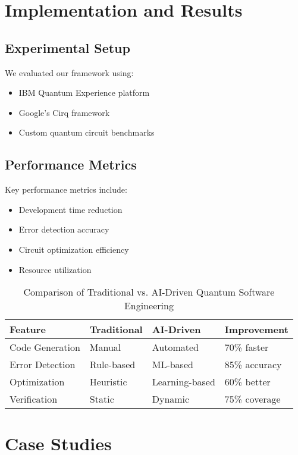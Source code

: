 \documentclass[10pt,twocolumn]{article}
\begin{document}
\section{Implementation and Results}
\subsection{Experimental Setup}
We evaluated our framework using:
\begin{itemize}[leftmargin=*]
    \item IBM Quantum Experience platform
    \item Google's Cirq framework
    \item Custom quantum circuit benchmarks
\end{itemize}

\subsection{Performance Metrics}
Key performance metrics include:
\begin{itemize}[leftmargin=*]
    \item Development time reduction
    \item Error detection accuracy
    \item Circuit optimization efficiency
    \item Resource utilization
\end{itemize}

\begin{table*}[t]
\centering
\begin{tabular}{@{}llll@{}}
\toprule
\textbf{Feature} & \textbf{Traditional} & \textbf{AI-Driven} & \textbf{Improvement} \\
\midrule
Code Generation & Manual & Automated & 70\% faster \\
Error Detection & Rule-based & ML-based & 85\% accuracy \\
Optimization & Heuristic & Learning-based & 60\% better \\
Verification & Static & Dynamic & 75\% coverage \\
\bottomrule
\end{tabular}
\caption{Comparison of Traditional vs. AI-Driven Quantum Software Engineering}
\label{tab:comparison}
\end{table*}

\section{Case Studies}
\end{document}
